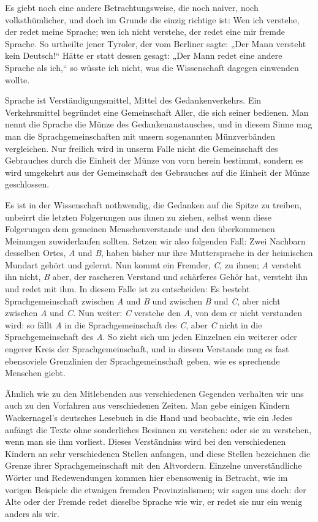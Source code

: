 Es giebt noch eine andere Betrachtungsweise, die noch naiver, noch volksthümlicher, und doch im Grunde die einzig richtige ist: Wen ich verstehe, der redet meine Sprache; wen ich nicht verstehe, der redet eine mir fremde Sprache. So urtheilte jener Tyroler, der vom Berliner sagte: „Der Mann versteht kein Deutsch!“ Hätte er statt dessen gesagt: „Der Mann redet eine andere Sprache als ich,“ so wüsste ich nicht, was die Wissenschaft dagegen einwenden wollte.

Sprache ist Verständigungsmittel, Mittel des Gedankenverkehrs. Ein \label{fp.56} Verkehrsmittel begründet eine Gemeinschaft Aller, die sich seiner bedienen. Man nennt die Sprache die Münze des Gedankenaustausches, und in diesem Sinne mag man die Sprachgemeinschaften mit unsern sogenannten Münzverbänden vergleichen. Nur freilich wird in unserm Falle nicht die Gemeinschaft des Gebrauches durch die Einheit der Münze von vorn herein bestimmt, sondern es wird umgekehrt aus der Gemeinschaft des Gebrauches auf die Einheit der Münze geschlossen.

Es ist in der Wissenschaft nothwendig, die Gedanken auf die Spitze zu treiben, unbeirrt die letzten Folgerungen aus ihnen zu ziehen, selbst wenn diese Folgerungen dem gemeinen Menschenverstande und den überkommenen Meinungen zuwiderlaufen sollten. Setzen wir also folgenden Fall: Zwei Nachbarn desselben \label{sp.56} Ortes, \textit{A} und \textit{B}, haben bisher nur ihre Muttersprache in der heimischen Mundart gehört und gelernt. Nun kommt ein Fremder, \textit{C}, zu ihnen; \textit{A} versteht ihn nicht, \textit{B} aber, der rascheren Verstand und schärferes Gehör hat, versteht ihn und redet mit ihm. In diesem Falle ist zu entscheiden: Es besteht Sprachgemeinschaft zwischen \textit{A} und \textit{B} und zwischen \textit{B} und \textit{C}, aber nicht zwischen \textit{A} und \textit{C}. Nun weiter: \textit{C} verstehe den \textit{A}, von dem er nicht verstanden wird: so fällt \textit{A} in die Sprachgemeinschaft des \textit{C}, aber \textit{C} nicht in die Sprachgemeinschaft des \textit{A}. So zieht sich um jeden Einzelnen ein weiterer oder engerer Kreis der Sprachgemeinschaft, und in diesem Verstande mag es fast ebensoviele Grenzlinien der Sprachgemeinschaft geben, wie es sprechende Menschen giebt.

Ähnlich wie zu den Mitlebenden aus verschiedenen Gegenden verhalten wir uns auch zu den Vorfahren aus verschiedenen Zeiten. Man gebe einigen Kindern Wackernagel’s deutsches Lesebuch in die Hand und beobachte, wie ein Jedes anfängt die Texte ohne sonderliches Besinnen zu verstehen: oder sie zu verstehen, wenn man sie ihm vorliest. Dieses Verständniss wird bei den verschiedenen Kindern an sehr verschiedenen Stellen anfangen, und diese Stellen bezeichnen die Grenze ihrer Sprachgemeinschaft mit den Altvordern. Einzelne unverständliche Wörter und Redewendungen kommen hier ebensowenig in Betracht, wie im vorigen Beispiele die etwaigen fremden Provinzialismen; wir sagen uns doch: der Alte oder der Fremde redet dieselbe Sprache wie wir, er redet sie nur ein wenig anders als wir.

